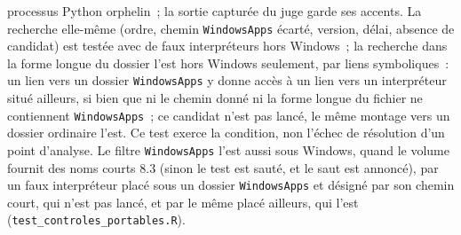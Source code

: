 \documentclass[a4paper,11pt]{article}
\newcommand{\code}[1]{\texttt{\small #1}}
\begin{document}
processus Python orphelin~; la sortie capturée du juge garde ses
accents. La recherche elle-même (ordre, chemin \code{WindowsApps} écarté,
version, délai, absence de candidat) est testée avec de faux interpréteurs
hors Windows~; la recherche dans la forme longue du dossier l'est hors
Windows seulement, par liens symboliques~: un lien vers un dossier
\code{WindowsApps} y donne accès à un lien vers un interpréteur situé
ailleurs, si bien que ni le chemin donné ni la forme longue du fichier ne
contiennent \code{WindowsApps}~; ce candidat n'est pas lancé, le même
montage vers un dossier ordinaire l'est. Ce test exerce la condition,
non l'échec de résolution d'un point d'analyse. Le filtre \code{WindowsApps}
l'est aussi sous Windows, quand le volume fournit des noms courts 8.3
(sinon le test est sauté, et le saut est annoncé), par un faux
interpréteur placé sous un dossier \code{WindowsApps} et désigné par son
chemin court, qui n'est pas lancé, et par le même placé ailleurs, qui
l'est (\code{test\_controles\_portables.R}).
\end{document}
